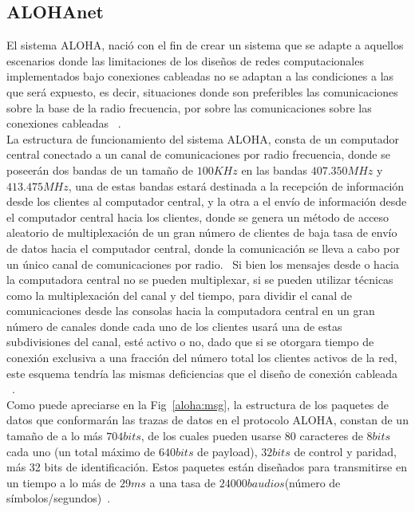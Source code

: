 \begin{justify}
\subsection{ALOHAnet}
El sistema ALOHA, nació con el fin de crear un sistema que se adapte a aquellos escenarios donde las limitaciones de los diseños de redes computacionales implementados bajo conexiones cableadas no se adaptan a las condiciones a las que será expuesto, es decir, situaciones donde son preferibles las comunicaciones sobre la base de la radio frecuencia, por sobre las comunicaciones sobre las conexiones cableadas ~\cite{NORMAN}.\\
La estructura de funcionamiento del sistema ALOHA, consta de un computador central conectado a un canal de comunicaciones por radio frecuencia, donde se poseerán dos bandas de un tamaño de $100KHz$ en las bandas $407.350 MHz$ y $413.475MHz$, una de estas bandas estará destinada a la recepción de información desde los clientes al computador central, y la otra a el envío de información desde el computador central hacia los clientes, donde se genera un método de acceso aleatorio de multiplexación de un gran número de clientes de baja tasa de envío de datos hacia el computador central, donde la comunicación se lleva a cabo por un único canal de comunicaciones por radio.~\cite{NORMAN} Si bien los mensajes desde o hacia la computadora central no se pueden multiplexar, si se pueden utilizar técnicas como la multiplexación del canal y del tiempo, para dividir el canal de comunicaciones desde las consolas hacia la computadora central en un gran número de canales donde cada uno de los clientes usará una de estas subdivisiones del canal, esté activo o no, dado que si se otorgara tiempo de conexión exclusiva a una fracción del número total los clientes activos de la red, este esquema tendría las mismas deficiencias que el diseño de conexión cableada ~\cite{Abdullah}.\\
Como puede apreciarse en la Fig~\ref{aloha:msg}, la estructura de los paquetes de datos que conformarán las trazas de datos en el protocolo ALOHA, constan de un tamaño de a lo más $704 bits$, de los cuales pueden usarse $80$ caracteres de $8 bits$ cada uno (un total máximo de $640 bits$ de payload), $32 bits$ de control y paridad, más 32 bits de identificación. Estos paquetes están diseñados para transmitirse en un tiempo a lo más de $29 ms$ a una tasa de $24000 baudios$(número de símbolos/segundos)~\cite{NORMAN}.\\
\begin{figure}[!ht]
\centering

\end{figure}
\end{justify}

